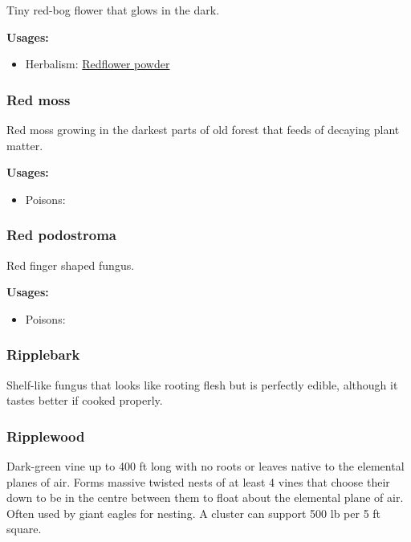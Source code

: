 Tiny red-bog flower that glows in the dark.

\vspace{5mm}

\textbf{Usages:}

\begin{itemize}[noitemsep]
\item[] Herbalism: \hyperref[Redflower powder]{Redflower powder}
\end{itemize}

\subsubsection{Red moss}
\label{Red moss}

Red moss growing in the darkest parts of old forest that feeds of decaying plant matter.

\vspace{5mm}

\textbf{Usages:}

\begin{itemize}[noitemsep]
\item[] Poisons: \poison
\end{itemize}

\subsubsection{Red podostroma}
\label{Red podostroma}

Red finger shaped fungus.

\vspace{5mm}

\textbf{Usages:}

\begin{itemize}[noitemsep]
\item[] Poisons: \poison
\end{itemize}

\subsubsection{Ripplebark}

Shelf-like fungus that looks like rooting flesh but is perfectly edible, although it tastes better if cooked properly.

\subsubsection{Ripplewood}

Dark-green vine up to 400 ft long with no roots or leaves native to the elemental planes of air. Forms massive twisted nests of at least 4 vines that choose their down to be in the centre between them to float about the elemental plane of air. Often used by giant eagles for nesting. A cluster can support 500 lb per 5 ft square.

